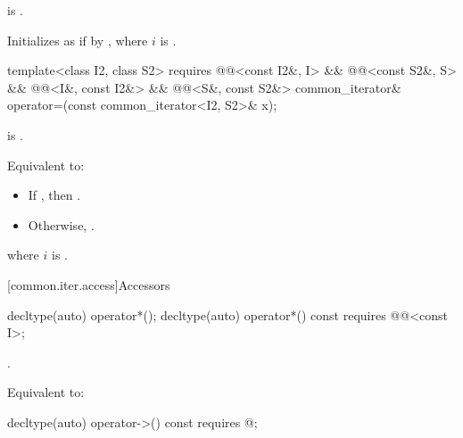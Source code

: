 \begin{itemdescr}
\pnum
\expects
{} is .

\pnum
\effects
Initializes  as if by
,
where $i$ is .
\end{itemdescr}

%
\begin{itemdecl}
template<class I2, class S2>
  requires @@<const I2&, I> && @@<const S2&, S> &&
           @@<I&, const I2&> && @@<S&, const S2&>
    common_iterator& operator=(const common_iterator<I2, S2>& x);
\end{itemdecl}

\begin{itemdescr}
\pnum
\expects
{} is .

\pnum
\effects
Equivalent to:
\begin{itemize}
\item If , then
.

\item Otherwise, .
\end{itemize}
where $i$ is .

\pnum
\returns
{}
\end{itemdescr}

[common.iter.access]{Accessors}

%
\begin{itemdecl}
decltype(auto) operator*();
decltype(auto) operator*() const
  requires @@<const I>;
\end{itemdecl}

\begin{itemdescr}
\pnum
\expects
{}.

\pnum
\effects
Equivalent to: 
\end{itemdescr}

%
\begin{itemdecl}
decltype(auto) operator->() const
  requires @\seebelow@;
\end{itemdecl}

